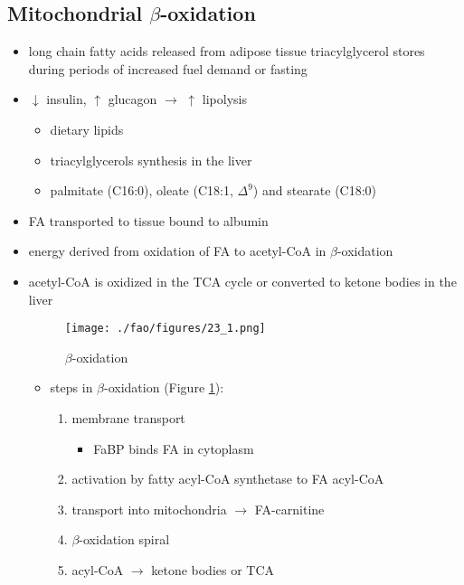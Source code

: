 \documentclass{scrartcl}
\begin{document}
\subsection{Mitochondrial \(\beta\)-oxidation}
\label{sec:org2307b5c}
\begin{itemize}
\item long chain fatty acids released from adipose tissue triacylglycerol
stores during periods of increased fuel demand or fasting
\item \(\downarrow\) insulin, \(\uparrow\) glucagon \(\to\) \(\uparrow\) lipolysis
\begin{itemize}
\item dietary lipids
\item triacylglycerols synthesis in the liver
\item palmitate (C16:0), oleate (C18:1, \(\Delta^{\text{9}}\)) and stearate (C18:0)
\end{itemize}
\item FA transported to tissue bound to albumin
\item energy derived from oxidation of FA to acetyl-CoA in \(\beta\)-oxidation
\item acetyl-CoA is oxidized in the TCA cycle or converted to ketone bodies in the liver

\begin{figure}[htbp]
\centering
\texttt{[image: ./fao/figures/23\_1.png]}
\caption{\label{fig:orgaee015a}
\(\beta\)-oxidation}
\end{figure}

\begin{itemize}
\item steps in \(\beta\)-oxidation (Figure \ref{fig:orgaee015a}):
\begin{enumerate}
\item membrane transport
\begin{itemize}
\item FaBP binds FA in cytoplasm
\end{itemize}
\item activation by fatty acyl-CoA synthetase to FA acyl-CoA
\item transport into mitochondria \(\to\) FA-carnitine
\item \(\beta\)-oxidation spiral
\item acyl-CoA \(\to\) ketone bodies or TCA
\end{enumerate}
\end{itemize}
\end{itemize}
\end{document}

